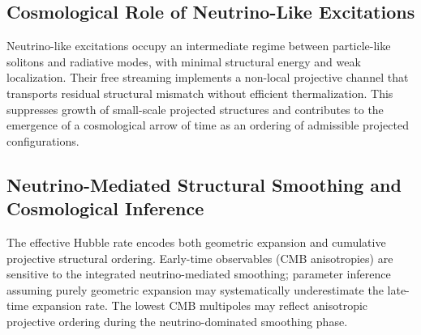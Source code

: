 \subsection{Cosmological Role of Neutrino-Like Excitations}
  \label{subsec:cosmological-role-of-neutrino-like-excitations}

  Neutrino-like excitations occupy an intermediate regime between
  particle-like solitons and radiative modes, with minimal structural
  energy and weak localization.
  Their free streaming implements a non-local projective channel that
  transports residual structural mismatch without efficient
  thermalization.
  This suppresses growth of small-scale projected structures and
  contributes to the emergence of a cosmological arrow of time as an
  ordering of admissible projected configurations.

\subsection{Neutrino-Mediated Structural Smoothing and
Cosmological Inference}
  \label{subsec:neutrino-mediated-structural-smoothing-and-cosmological-inference}

  The effective Hubble rate encodes both geometric expansion and
  cumulative projective structural ordering.
  Early-time observables (CMB anisotropies) are sensitive to the
  integrated neutrino-mediated smoothing; parameter inference assuming
  purely geometric expansion may systematically underestimate the
  late-time expansion rate.
  The lowest CMB multipoles may reflect anisotropic projective ordering
  during the neutrino-dominated smoothing phase.
